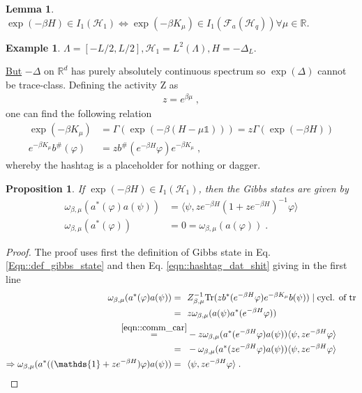 \documentclass[
a4paper, %
11pt, %
onecolumn, %
openany, %
]{memoir}
\theoremstyle{definition}
\newtheorem{example}{Example}[chapter]
\theoremstyle{remark}
\theoremstyle{plain}
\newtheorem{prop}{Proposition}[chapter]
\newtheorem{lemma}{Lemma}[chapter]
\begin{document}
\begin{lemma}
	$\exp(-\beta H)\in I_1(\mathcal{H}_1)\Leftrightarrow \exp(-\beta K_{\mu})\in I_1(\mathcal{F}_a(\mathcal{H}_q))\forall\mu\in \mathbb{R}$.
\end{lemma}
\begin{example}
	$\Lambda=[-L/2,L/2], \mathcal{H}_1=L^2(\Lambda), H=-\Delta_L$.

\underline{But} $-\Delta$ on $\mathbb{R}^d$ has purely absolutely continuous spectrum so $\exp(\Delta)$ cannot be trace-class. Defining the activity Z as \begin{align}
z=e^{\beta\mu}\; ,
\end{align}
one can find the following relation \begin{align}
\exp(-\beta K_{\mu})&=\Gamma(\exp(-\beta(H-\mu\mathds{1})))=z\Gamma(\exp(-\beta H))\\
e^{-\beta K_{\mu}}b^{\#}(\varphi)&=zb^{\#}(e^{-\beta H}\varphi)e^{-\beta K_{\mu}}\label{eqn::hashtag_dat_shit}\; ,
\end{align}
whereby the hashtag is a placeholder for nothing or dagger.
\begin{prop}
	If $\exp(-\beta H)\in I_1(\mathcal{H}_1)$, then the Gibbs states are given by\begin{align}
	\omega_{\beta,\mu}(a^{*}(\varphi)a(\psi))&=\langle \psi, ze^{-\beta H}(1+ze^{-\beta H})^{-1}\varphi\rangle\\
	\omega_{\beta,\mu}(a^*(\varphi))&=0=\omega_{\beta,\mu}(a(\varphi))\; .
	\end{align}
\end{prop}
\begin{proof}
	The proof uses first the definition of Gibbs state in Eq. \eqref{Eqn::def_gibbs_state} and then Eq. \eqref{eqn::hashtag_dat_shit} giving in the first line\begin{align}
	\omega_{\beta,\mu}(a^{*}(\varphi)a(\psi))=~~&Z^{-1}_{\beta,\mu}\mathrm{Tr}(zb^*(e^{-\beta H}\varphi)e^{-\beta K_{\mu}}b(\psi)) \mid \text{cycl. of tr}\\
	=~~&z\omega_{\beta,\mu}(a(\psi)a^*(e^{-\beta H}\varphi)) \\
	\overset{\eqref{eqn::comm_car}}{=}& -z\omega_{\beta,\mu}(a^*(e^{-\beta H}\varphi)a(\psi))\langle \psi, ze^{-\beta H}\varphi\rangle\\
	=~~&-\omega_{\beta,\mu}(a^*(ze^{-\beta H}\varphi)a(\psi))\langle \psi, ze^{-\beta H}\varphi\rangle\\
	\Rightarrow \omega_{\beta,\mu}(a^*((\mathds{1}+ze^{-\beta H})\varphi)a(\psi))=~~&\langle \psi, ze^{-\beta H} \varphi\rangle\; .

\end{align}
\end{proof}
\end{example}
\end{document}
